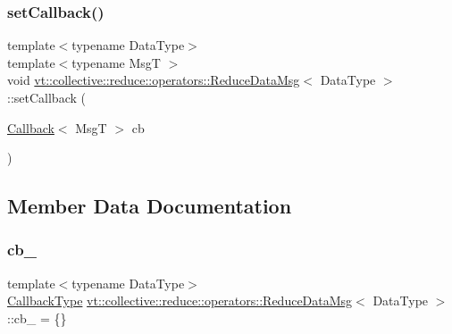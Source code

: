 \mbox{\label{structvt_1_1collective_1_1reduce_1_1operators_1_1_reduce_data_msg_afc3de5443774bc3838c9ccca05054210}} 
\subsubsection{\texorpdfstring{set\+Callback()}{setCallback()}}
{\footnotesize\ttfamily template$<$typename Data\+Type$>$ \\
template$<$typename MsgT $>$ \\
void \hyperlink{structvt_1_1collective_1_1reduce_1_1operators_1_1_reduce_data_msg}{vt\+::collective\+::reduce\+::operators\+::\+Reduce\+Data\+Msg}$<$ Data\+Type $>$\+::set\+Callback (\begin{DoxyParamCaption}\item[{\hyperlink{namespacevt_a36db99df4c973d48b1118a293fff533f}{Callback}$<$ MsgT $>$}]{cb }\end{DoxyParamCaption})\hspace{0.3cm}{\ttfamily [inline]}}



\subsection{Member Data Documentation}
\mbox{\label{structvt_1_1collective_1_1reduce_1_1operators_1_1_reduce_data_msg_a89c7b9270ac15672f38c7256abe3c044}} 
\subsubsection{\texorpdfstring{cb\+\_\+}{cb\_}}
{\footnotesize\ttfamily template$<$typename Data\+Type$>$ \\
\hyperlink{structvt_1_1collective_1_1reduce_1_1operators_1_1_reduce_data_msg_a299d0d7f62e0e631ef344e345d89a4f3}{Callback\+Type} \hyperlink{structvt_1_1collective_1_1reduce_1_1operators_1_1_reduce_data_msg}{vt\+::collective\+::reduce\+::operators\+::\+Reduce\+Data\+Msg}$<$ Data\+Type $>$\+::cb\+\_\+ = \{\}\hspace{0.3cm}{\ttfamily [protected]}}

